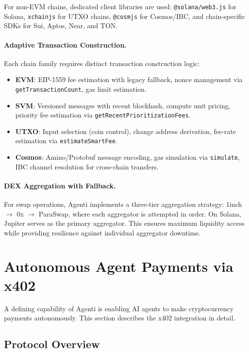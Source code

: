 \documentclass[11pt]{article}
\begin{document}
For non-EVM chains, dedicated client libraries are used: \texttt{@solana/web3.js} for Solana, \texttt{xchainjs} for UTXO chains, \texttt{@cosmjs} for Cosmos/IBC, and chain-specific SDKs for Sui, Aptos, Near, and TON.

\paragraph{Adaptive Transaction Construction.} Each chain family requires distinct transaction construction logic:
\begin{itemize}[leftmargin=*]
  \item \textbf{EVM}: EIP-1559 fee estimation with legacy fallback, nonce management via \texttt{getTransactionCount}, gas limit estimation.
  \item \textbf{SVM}: Versioned messages with recent blockhash, compute unit pricing, priority fee estimation via \texttt{getRecentPrioritizationFees}.
  \item \textbf{UTXO}: Input selection (coin control), change address derivation, fee-rate estimation via \texttt{estimateSmartFee}.
  \item \textbf{Cosmos}: Amino/Protobuf message encoding, gas simulation via \texttt{simulate}, IBC channel resolution for cross-chain transfers.
\end{itemize}

\paragraph{DEX Aggregation with Fallback.} For swap operations, Agenti implements a three-tier aggregation strategy: 1inch $\rightarrow$ 0x $\rightarrow$ ParaSwap, where each aggregator is attempted in order. On Solana, Jupiter serves as the primary aggregator. This ensures maximum liquidity access while providing resilience against individual aggregator downtime.

\section{Autonomous Agent Payments via x402}
\label{sec:payment}

A defining capability of Agenti is enabling AI agents to make cryptocurrency payments autonomously. This section describes the x402 integration in detail.

\subsection{Protocol Overview}
\end{document}

